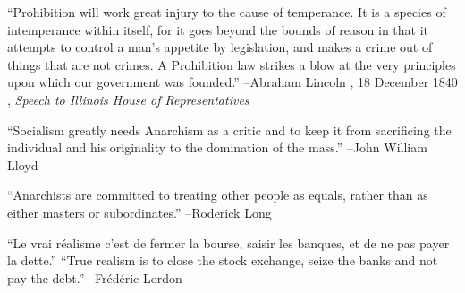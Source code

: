 \documentclass{article}%
\begin{document}
\begin{minipage}{\textwidth}%
\flushleft%
“Prohibition will work great injury to the cause of temperance. It is a species of intemperance within itself, for it goes beyond the bounds of reason in that it attempts to control a man's appetite by legislation, and makes a crime out of things that are not crimes. A Prohibition law strikes a blow at the very principles upon which our government was founded.”%
\linebreak%
\vspace{1mm}%
–Abraham Lincoln%
, 18 December 1840%
, \textit{Speech to Illinois House of Representatives}%
\linebreak%
\vspace{1mm}%
\end{minipage}%
\linebreak%
\vspace{1mm}%
\begin{minipage}{\textwidth}%
\flushleft%
“Socialism greatly needs Anarchism as a critic and to keep it from sacrificing the individual and his originality to the domination of the mass.”%
\linebreak%
\vspace{1mm}%
–John William Lloyd%
\linebreak%
\vspace{1mm}%
\end{minipage}%
\linebreak%
\vspace{1mm}%
\begin{minipage}{\textwidth}%
\flushleft%
“Anarchists are committed to treating other people as equals, rather than as either masters or subordinates.”%
\linebreak%
\vspace{1mm}%
–Roderick Long%
\linebreak%
\vspace{1mm}%
\end{minipage}%
\linebreak%
\vspace{1mm}%
\begin{minipage}{\textwidth}%
\flushleft%
“Le vrai réalisme c'est de fermer la bourse, saisir les banques, et de ne pas payer la dette.”%
\linebreak%
\vspace{1mm}%
“True realism is to close the stock exchange, seize the banks and not pay the debt.”%
\linebreak%
–Frédéric Lordon%
\linebreak%
\vspace{1mm}%
\end{minipage}%
\end{document}
